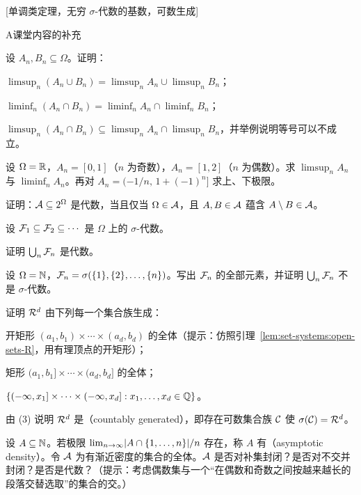 [单调类定理，无穷 \texorpdfstring{$\sigma$}{σ}-代数的基数，可数生成]
\label{hw:set-systems}


\begin{exercises}{A}{课堂内容的补充}
\item\label{ex:set-systems:A1} 设 $A_n,B_n\subseteq\Omega$。证明：
\begin{questions}
\item $\limsup_n(A_n\cup B_n)=\limsup_nA_n\cup\limsup_nB_n$；
\item $\liminf_n(A_n\cap B_n)=\liminf_nA_n\cap\liminf_nB_n$；
\item $\limsup_n(A_n\cap B_n)\subseteq\limsup_nA_n\cap\limsup_nB_n$，并举例说明等号可以不成立。
\end{questions}
\item 设 $\Omega=\mathbb{R}$，$A_n=[0,1]$（$n$ 为奇数），$A_n=[1,2]$（$n$ 为偶数）。求 $\limsup_nA_n$ 与 $\liminf_nA_n$。再对 $A_n=(-1/n,\,1+(-1)^n]$ 求上、下极限。
\item 证明：$\mathcal{A}\subseteq2^\Omega$ 是代数，当且仅当 $\Omega\in\mathcal{A}$，且 $A,B\in\mathcal{A}$ 蕴含 $A\setminus B\in\mathcal{A}$。
\item\label{ex:set-systems:A4} 设 $\mathcal{F}_1\subseteq\mathcal{F}_2\subseteq\cdots$ 是 $\Omega$ 上的 $\sigma$-代数。
\begin{questions}
\item 证明 $\bigcup_n\mathcal{F}_n$ 是代数。
\item 设 $\Omega=\mathbb{N}$，$\mathcal{F}_n=\sigma(\{1\},\{2\},\dots,\{n\})$。写出 $\mathcal{F}_n$ 的全部元素，并证明 $\bigcup_n\mathcal{F}_n$ 不是 $\sigma$-代数。
\end{questions}
\item\label{ex:set-systems:A5} 证明 $\mathcal{R}^d$ 由下列每一个集合族生成：
\begin{questions}
\item 开矩形 $(a_1,b_1)\times\cdots\times(a_d,b_d)$ 的全体（提示：仿照引理~\ref{lem:set-systems:open-sets-R}，用有理顶点的开矩形）；
\item 矩形 $(a_1,b_1]\times\cdots\times(a_d,b_d]$ 的全体；
\item $\{(-\infty,x_1]\times\cdots\times(-\infty,x_d]: x_1,\dots,x_d\in\mathbb{Q}\}$。
\end{questions}
由 (3) 说明 $\mathcal{R}^d$ 是（countably generated），即存在可数集合族 $\mathcal{C}$ 使 $\sigma(\mathcal{C})=\mathcal{R}^d$。
\item 设 $A\subseteq\mathbb{N}$。若极限 $\lim_{n\to\infty}\lvert A\cap\{1,\dots,n\}\rvert/n$ 存在，称 $A$ 有（asymptotic density）。令 $\mathcal{A}$ 为有渐近密度的集合的全体。$\mathcal{A}$ 是否对补集封闭？是否对不交并封闭？是否是代数？（提示：考虑偶数集与一个“在偶数和奇数之间按越来越长的段落交替选取”的集合的交。）

\end{exercises}

